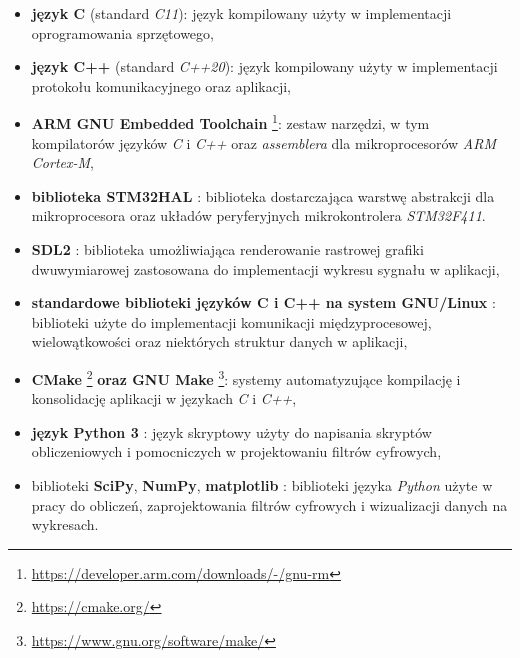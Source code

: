 \begin{itemize}

    \item \textbf{język C} (standard \textit{C11}): język kompilowany użyty w implementacji oprogramowania sprzętowego,

    \item \textbf{język C++} (standard \textit{C++20}): język kompilowany użyty w implementacji 
    protokołu komunikacyjnego oraz aplikacji,

    \item \textbf{ARM GNU Embedded Toolchain} \footnote{\url{https://developer.arm.com/downloads/-/gnu-rm}}: zestaw narzędzi, w tym
    kompilatorów języków \textit{C} i \textit{C++} oraz \textit{assemblera} dla mikroprocesorów \textit{ARM Cortex-M},

    \item \textbf{biblioteka STM32HAL} \cite{STM32HAL}: biblioteka dostarczająca warstwę abstrakcji dla mikroprocesora 
    oraz układów peryferyjnych mikrokontrolera \textit{STM32F411}.

    \item \textbf{SDL2} \cite{SDL2}: biblioteka umożliwiająca renderowanie rastrowej grafiki dwuwymiarowej zastosowana
    do implementacji wykresu sygnału w aplikacji,

    \item \textbf{standardowe biblioteki języków C i C++ na system GNU/Linux} \cite{GLIBC238}: biblioteki użyte do 
    implementacji komunikacji międzyprocesowej, wielowątkowości oraz niektórych struktur danych w aplikacji,

    \item \textbf{CMake} \footnote{\url{https://cmake.org/}} \textbf{oraz GNU Make} 
    \footnote{\url{https://www.gnu.org/software/make/}}: systemy automatyzujące 
    kompilację i konsolidację aplikacji w językach \textit{C} i \textit{C++},

    \item \textbf{język Python 3} \cite{python}: język skryptowy użyty do napisania 
    skryptów obliczeniowych i pomocniczych w projektowaniu filtrów cyfrowych,
   
\item biblioteki \textbf{SciPy}, \textbf{NumPy}, \textbf{matplotlib}
    \cite{SciPy} \cite{NumPy} \cite{matplotlib}: biblioteki języka \textit{Python} użyte w pracy 
    do obliczeń, zaprojektowania filtrów cyfrowych i wizualizacji danych na wykresach.

\end{itemize}

